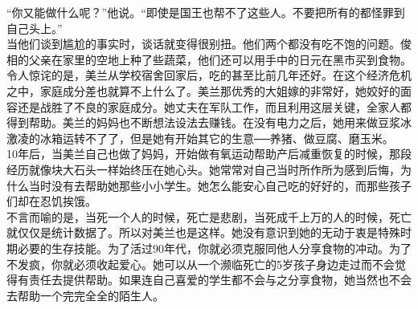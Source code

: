 “你又能做什么呢？”他说。“即使是国王也帮不了这些人。不要把所有的都怪罪到自己头上。”\\

当他们谈到尴尬的事实时，谈话就变得很别扭。他们两个都没有吃不饱的问题。俊相的父亲在家里的空地上种了些蔬菜，他们还可以用手中的日元在黑市买到食物。令人惊诧的是，美兰从学校宿舍回家后，吃的甚至比前几年还好。在这个经济危机之中，家庭成分差也就算不上什么了。美兰那优秀的大姐嫁的非常好，她姣好的面容还是战胜了不良的家庭成分。她丈夫在军队工作，而且利用这层关键，全家人都得到帮助。美兰的妈妈也不断想法设法去赚钱。在没有电力之后，她用来做豆浆冰激凌的冰箱运转不了了，但是她有开始其它的生意──养猪、做豆腐、磨玉米。\\

10年后，当美兰自己也做了妈妈，开始做有氧运动帮助产后减重恢复的时候，那段经历就像块大石头一样始终压在她心头。她常常对自己当时所作所为感到后悔，为什么当时没有去帮助她那些小小学生。她怎么能安心自己吃的好好的，而那些孩子们却在忍饥挨饿。\\

不言而喻的是，当死一个人的时候，死亡是悲剧，当死成千上万的人的时候，死亡就仅仅是统计数据了。所以对美兰也是这样。她没有意识到她的无动于衷是特殊时期必要的生存技能。为了活过90年代，你就必须克服同他人分享食物的冲动。为了不发疯，你就必须收起爱心。她可以从一个濒临死亡的5岁孩子身边走过而不会觉得有责任去提供帮助。如果连自己喜爱的学生都不会与之分享食物，她当然也不会去帮助一个完完全全的陌生人。\\
